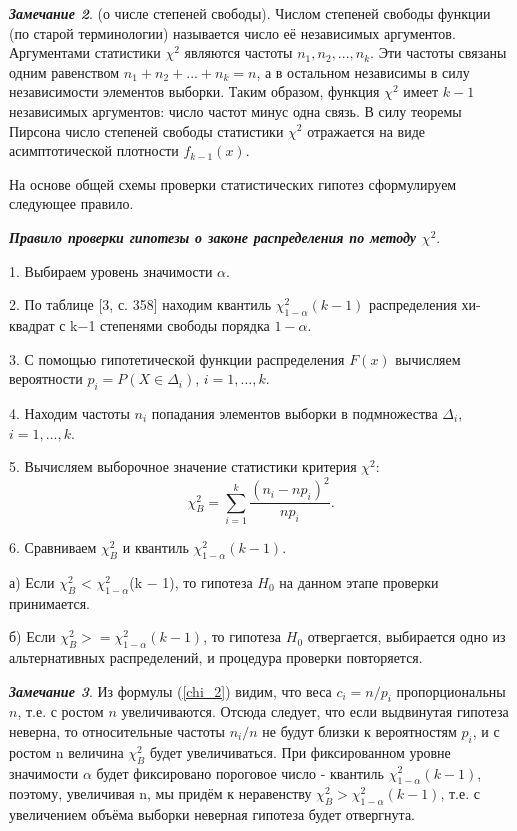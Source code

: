\documentclass[a4paper]{article}
\begin{document}
\textbf{\textit{Замечание 2}}. (о числе степеней свободы).
Числом степеней свободы функции (по старой терминологии) называется число её независимых аргументов. Аргументами статистики $\chi^{2}$ являются частоты $n_{1},n_{2}, ... ,n_{k}$. Эти частоты связаны одним равенством $n_{1} + n_{2} + ... + n_{k}  = n$, а в остальном независимы в силу независимости элементов выборки. Таким образом, функция $\chi^{2}$  имеет $k-1$ независимых аргументов: число частот минус одна связь. В силу теоремы Пирсона число степеней свободы статистики $\chi^{2}$  отражается на виде асимптотической плотности $f_{k - 1}(x)$.

На основе общей схемы проверки статистических гипотез сформулируем следующее правило.

\textbf{\textit{Правило проверки гипотезы о законе распределения по методу $\chi^{2}$}}.

1. Выбираем уровень значимости $\alpha$.

2. По таблице [3, с. 358] находим квантиль $\chi^{2}_{1-\alpha}(k - 1)$ распределения хи-квадрат с k$-$1 степенями свободы порядка $1-\alpha$. 

3. С помощью гипотетической функции распределения $F(x)$ вычисляем вероятности $p_{i} = P (X \in \Delta_{i})$, $i = 1, ... ,k$.

4. Находим частоты $n_{i}$ попадания элементов выборки в подмножества $\Delta_{i}$, $i = 1, ... ,k$. 

5. Вычисляем выборочное значение статистики критерия $\chi^{2}$:
\begin{equation}
\chi^{2}_{B} =\sum_{i = 1}^{k}{\frac{(n_{i} - np_{i})^{2}}{np_{i}}}.
\label{chi_B}
\end{equation}

6. Сравниваем $\chi^{2}_{B}$ и квантиль $\chi^{2}_{1-\alpha}(k-1)$.

а) Если $\chi^{2}_{B}$ < $\chi^{2}_{1-\alpha}$(k $-$ 1), то гипотеза $H_{0}$ на данном этапе проверки принимается. 

б) Если $\chi^{2}_{B} >= \chi^{2}_{1-\alpha}(k -1)$, то гипотеза $H_{0}$ отвергается, выбирается одно из альтернативных распределений, и процедура проверки повторяется.

\textbf{\textit{Замечание 3}}. Из формулы (\ref{chi_2}) видим, что веса $c_i = n/p_{i}$ пропорциональны $n$, т.е. с ростом $n$ увеличиваются. Отсюда следует, что если выдвинутая гипотеза неверна, то относительные частоты $n_{i}/n$ не будут близки к вероятностям $p_{i}$, и с ростом n величина  $\chi^{2}_{B}$  будет увеличиваться. При фиксированном уровне значимости $\alpha$ будет фиксировано пороговое число - квантиль $\chi^{2}_{1-\alpha}(k-1)$, поэтому, увеличивая n, мы придём к неравенству $\chi^{2}_{B} > \chi^{2}_{1-\alpha}(k-1)$, т.е. с увеличением объёма выборки неверная гипотеза будет отвергнута.
\end{document}
